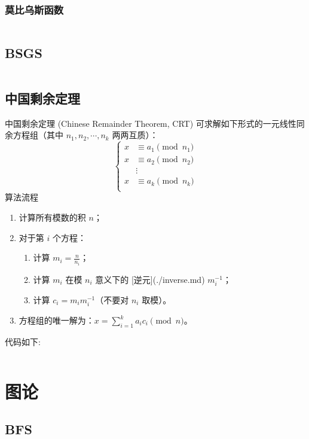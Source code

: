 \documentclass[a4paper,11pt]{article}
\begin{document}
\subsubsection{莫比乌斯函数}
\inputminted[breaklines,linenos,frame=leftline]{c++}{math/MobiusFunction.cpp}

\subsection{BSGS}
\inputminted[breaklines,linenos,frame=leftline]{c++}{math/BSGS.cpp}

\subsection{中国剩余定理}
中国剩余定理 (Chinese Remainder Theorem, CRT) 可求解如下形式的一元线性同余方程组（其中 $n_1, n_2, \cdots, n_k$ 两两互质）：
$$
\begin{cases}
x &\equiv a_1 \pmod {n_1} \\
x &\equiv a_2 \pmod {n_2} \\
  &\vdots \\
x &\equiv a_k \pmod {n_k} \\
\end{cases}
$$
算法流程
\begin{enumerate}
    \item 计算所有模数的积 $n$；
    \item 对于第 $i$ 个方程：
        \begin{enumerate}
            \item 计算 $m_i=\frac{n}{n_i}$；
            \item 计算 $m_i$ 在模 $n_i$ 意义下的 [逆元](./inverse.md)  $m_i^{-1}$；
            \item 计算 $c_i=m_im_i^{-1}$（不要对 $n_i$ 取模）。
        \end{enumerate}
    \item 方程组的唯一解为：$x=\sum_{i=1}^k a_ic_i \pmod n$。
\end{enumerate}
代码如下:
\inputminted[breaklines,linenos,frame=leftline]{c++}{math/crt.cpp}

\newpage
\section{图论} %

\subsection{BFS}
\end{document}
